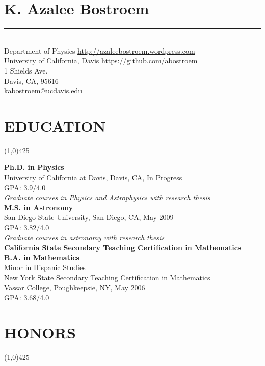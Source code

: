 \documentclass{res}
\begin{document}
 

\section{{\LARGE \bf{K. Azalee Bostroem}}}
{\rule{\linewidth}{0.5mm}} \\
Department of Physics \hfill {\color{blue}\url{http://azaleebostroem.wordpress.com}}\\
University of California, Davis \hfill {\color{blue}\url{https://github.com/abostroem} }\\
1 Shields Ave. \\
Davis, CA, 95616 \\
kabostroem@ucdavis.edu
\begin{resume}
\section{EDUCATION}
\vspace{-.2in} 
\begin{center}
\line(1,0){425}
\end{center}
\vspace{-.3in} 
\vspace{0.1in} 
 
   {\bf Ph.D. in Physics} \\
   University of California at Davis, Davis, CA, In Progress \\
   GPA: 3.9/4.0 \\
   \emph{Graduate courses in Physics and Astrophysics with research thesis} \\
    {\bf M.S. in Astronomy} \\
    San Diego State University, San Diego, CA, May 2009 \\
    GPA: 3.82/4.0 \\
    \emph{Graduate courses in astronomy with research thesis} \\
    {\bf California State Secondary Teaching Certification in Mathematics} \\
    {\bf B.A. in Mathematics }\\
    Minor in Hispanic Studies \\
    New York State Secondary Teaching Certification in Mathematics \\
    Vassar College, Poughkeepsie, NY, May 2006\\
    GPA: 3.68/4.0   
 
\section{HONORS}
\vspace{-.2in} 
\begin{center}
\line(1,0){425}
\end{center}
\vspace{-.3in} 
\vspace{0.1in} 


\end{resume}
\end{document}
